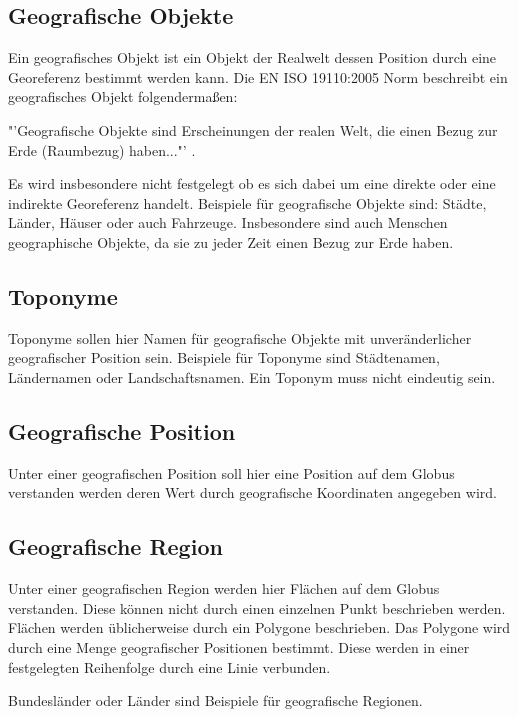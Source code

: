 		\subsection{Geografische Objekte}
			
			Ein geografisches Objekt ist ein Objekt der Realwelt dessen Position durch eine Georeferenz bestimmt werden kann. 
			Die EN ISO 19110:2005 Norm beschreibt ein geografisches Objekt folgendermaßen: 

			"'Geografische Objekte sind Erscheinungen der realen Welt, die einen Bezug zur Erde (Raumbezug) haben..."' \cite{ISO19110:2005}.

			Es wird insbesondere nicht festgelegt ob es sich dabei um eine direkte oder eine indirekte Georeferenz handelt.
			Beispiele für geografische Objekte sind: Städte, Länder, Häuser oder auch Fahrzeuge.
			Insbesondere sind auch Menschen geographische Objekte, da sie zu jeder Zeit einen Bezug zur Erde haben.

		\subsection{Toponyme}  
			
			Toponyme sollen hier Namen für geografische Objekte mit unveränderlicher geografischer Position sein.
			Beispiele für Toponyme sind Städtenamen, Ländernamen oder Landschaftsnamen.  
			Ein Toponym muss nicht eindeutig sein. 

		\subsection{Geografische Position}
		
			Unter einer geografischen Position soll hier eine Position auf dem Globus verstanden werden deren Wert durch geografische Koordinaten angegeben wird.

		\subsection{Geografische Region} 
			
			Unter einer geografischen Region werden hier Flächen auf dem Globus verstanden.
			Diese können nicht durch einen einzelnen Punkt beschrieben werden. 
			Flächen werden üblicherweise durch ein Polygone beschrieben. 
			Das Polygone wird durch eine Menge geografischer Positionen bestimmt.
			Diese werden in einer festgelegten Reihenfolge durch eine Linie verbunden.

			Bundesländer oder Länder sind Beispiele für geografische Regionen.
			
